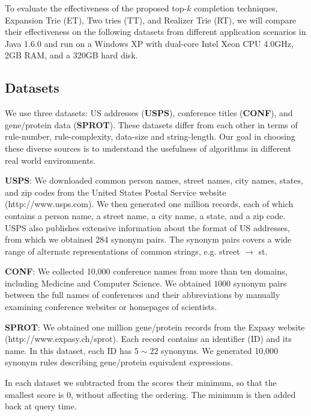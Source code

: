 \documentclass{sig-alternate}
\begin{document}
To evaluate the effectiveness of the proposed top-$k$ completion
techniques, Expansion Trie (ET), Two tries (TT), and  Realizer Trie (RT), we will compare
their effectiveness on the following datasets from different
application scenarios in Java $1.6.0$ and run on a
Windows XP with dual-core Intel Xeon CPU 4.0GHz, 2GB RAM, and a 320GB hard disk.


\subsection{Datasets}
We use three datasets: US addresses (\textbf{USPS}),
conference titles  (\textbf{CONF}), and gene/protein data
(\textbf{SPROT}). These datasets differ from each other in terms of rule-number, rule-complexity, data-size and string-length. Our goal in choosing these diverse sources is to understand the usefulness of algorithms in different real world environments.

\smallskip
\noindent \textbf{{USPS}}: We downloaded common person names, street names,
city names, states, and zip codes from the United States Postal
Service website ({\footnotesize http://www.usps.com}). We then generated
one million records, each of which contains a person name, a street
name, a city name, a state, and a zip code. USPS also publishes
extensive information about the format of US addresses, from which we
obtained 284 synonym pairs. The synonym pairs covers a wide range of alternate
representations of common strings, e.g. street $\rightarrow$ st.


\noindent \textbf{{CONF}}: We collected 10,000 conference names
from more than ten domains, including Medicine and Computer
Science.
We obtained $1000$ synonym pairs between the full names of conferences and their
abbreviations by manually examining conference websites or homepages
of scientists.


\noindent \textbf{{SPROT}}: We obtained one million gene/protein records
from the Expasy website ({\footnotesize http://www.expasy.ch/sprot}).
Each record contains an identifier (ID) and its name.
In this dataset, each ID has $5\sim22$ synonyms. We generated 10,000 synonym rules describing gene/protein
equivalent expressions.

In each dataset we subtracted from the scores their minimum,
so that the smallest score is 0, without affecting the
ordering. The minimum is then added back at query time.
\end{document}
